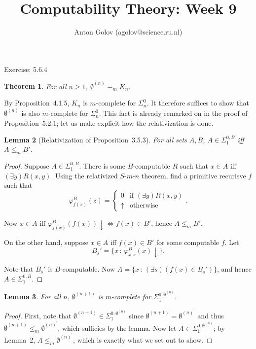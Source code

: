 \documentclass{article}
\title{Computability Theory: Week 9}
\author{Anton Golov (agolov@science.ru.nl)}
\newtheorem{theorem}{Theorem}
\newtheorem{lemma}[theorem]{Lemma}
\newcommand{\compr}[2]{\{ #1 \,:\, #2 \}}
\newcommand{\terminates}{\!\!\downarrow}
\newcommand{\njump}{\emptyset^{(n)}}
\newcommand{\njumpprime}{\emptyset^{(n)^\prime}}
\newcommand{\snjump}{\emptyset^{(n+1)}}
\begin{document}
  \maketitle

  Exercise: 5.6.4

  \begin{theorem}
    For all $n \ge 1$, $\njump \equiv_m K_n$.
  \end{theorem}

  By Proposition~4.1.5, $K_n$ is $m$-complete for $\Sigma^0_n$.  It therefore suffices to show that $\njump$ is
  also $m$-complete for $\Sigma^0_n$.  This fact is already remarked on in the proof of Proposition~5.2.1; let us make
  explicit how the relativization is done.

  \begin{lemma}[Relativization of Proposition~3.5.3]
    For all sets $A, B$, $A \in \Sigma^{0, B}_1$ iff $A \le_m B'$.
  \end{lemma}

  \begin{proof}
    Suppose $A \in \Sigma^{0, B}_1$.  There is some $B$-computable $R$ such that $x \in A$ iff $(\exists y) R(x, y)$.
    Using the relativized $S$-$m$-$n$ theorem, find a primitive recurisve $f$ such that
    \[
      \varphi^B_{f(x)}(z) =
      \begin{cases}
        0 & \text{if $(\exists y) R(x, y)$}\\
        \uparrow & \text{otherwise}
      \end{cases}
    .\]

    Now $x \in A$ iff $\varphi^B_{f(x)}(f(x))\terminates \iff f(x) \in B'$, hence $A \le_m B'$.

    On the other hand, suppose $x \in A$ iff $f(x) \in B'$ for some computable $f$.  Let
    \[
      B_s' = \compr{x}{\varphi^B_{x, s}(x)\terminates}.
    \]

    Note that $B_s'$ is $B$-computable.  Now $A = \compr{x}{(\exists s)(f(x) \in B_s')}$, and hence $A \in \Sigma^{0, B}_1$.
  \end{proof}

  \begin{lemma}
    For all $n$, $\snjump$ is $m$-complete for $\Sigma^{0, \njump}_1$.
  \end{lemma}

  \begin{proof}
    First, note that $\snjump \in \Sigma^{0, \njump}_1$ since $\snjump = \njumpprime$ and thus $\snjump \le_m
    \njumpprime$, which sufficies by the lemma.  Now let $A \in \Sigma^{0, \njump}_1$; by Lemma~2, $A \le_m \njumpprime$,
    which is exactly what we set out to show.
  \end{proof}
\end{document}
